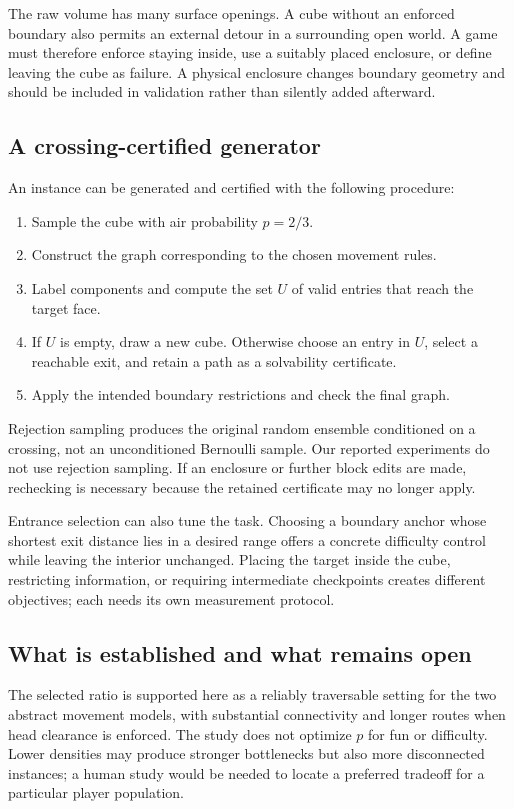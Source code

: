\documentclass[11pt,letterpaper]{article}
\begin{document}
The raw volume has many surface openings. A cube without an enforced boundary
also permits an external detour in a surrounding open world. A game must
therefore enforce staying inside, use a suitably placed enclosure, or define
leaving the cube as failure. A physical enclosure changes boundary geometry
and should be included in validation rather than silently added afterward.

\subsection{A crossing-certified generator}
An instance can be generated and certified with the following procedure:
\begin{enumerate}[leftmargin=1.5em,itemsep=3pt]
 \item Sample the cube with air probability $p=2/3$.
 \item Construct the graph corresponding to the chosen movement rules.
 \item Label components and compute the set $U$ of valid entries that reach
 the target face.
 \item If $U$ is empty, draw a new cube. Otherwise choose an entry in $U$,
 select a reachable exit, and retain a path as a solvability certificate.
 \item Apply the intended boundary restrictions and check the final graph.
\end{enumerate}
Rejection sampling produces the original random ensemble conditioned on a
crossing, not an unconditioned Bernoulli sample. Our reported experiments do
not use rejection sampling. If an enclosure or further block edits are made,
rechecking is necessary because the retained certificate may no longer apply.

Entrance selection can also tune the task. Choosing a boundary anchor whose
shortest exit distance lies in a desired range offers a concrete difficulty
control while leaving the interior unchanged. Placing the target inside the
cube, restricting information, or requiring intermediate checkpoints creates
different objectives; each needs its own measurement protocol.

\subsection{What is established and what remains open}
The selected ratio is supported here as a reliably traversable setting for
the two abstract movement models, with substantial connectivity and longer
routes when head clearance is enforced. The study does not optimize $p$ for
fun or difficulty. Lower densities may produce stronger bottlenecks but also
more disconnected instances; a human study would be needed to locate a
preferred tradeoff for a particular player population.
\end{document}
